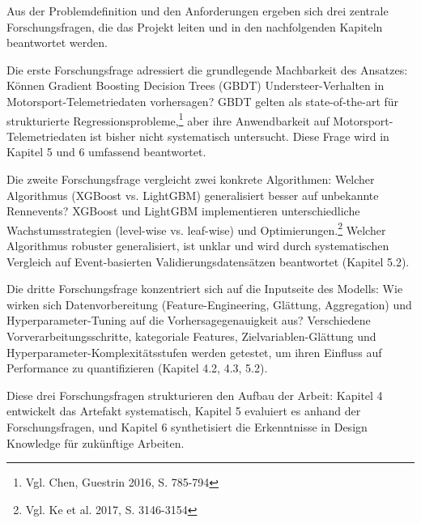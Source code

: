 Aus der Problemdefinition und den Anforderungen ergeben sich drei zentrale Forschungsfragen, die das Projekt leiten und in den nachfolgenden Kapiteln beantwortet werden.

Die erste Forschungsfrage adressiert die grundlegende Machbarkeit des Ansatzes: Können Gradient Boosting Decision Trees (GBDT) Understeer-Verhalten in Motorsport-Telemetriedaten vorhersagen? GBDT gelten als state-of-the-art für strukturierte Regressionsprobleme,\footnote{Vgl. Chen, Guestrin 2016, S. 785-794} aber ihre Anwendbarkeit auf Motorsport-Telemetriedaten ist bisher nicht systematisch untersucht. Diese Frage wird in Kapitel 5 und 6 umfassend beantwortet.

Die zweite Forschungsfrage vergleicht zwei konkrete Algorithmen: Welcher Algorithmus (XGBoost vs. LightGBM) generalisiert besser auf unbekannte Rennevents? XGBoost und LightGBM implementieren unterschiedliche Wachstumsstrategien (level-wise vs. leaf-wise) und Optimierungen.\footnote{Vgl. Ke et al. 2017, S. 3146-3154} Welcher Algorithmus robuster generalisiert, ist unklar und wird durch systematischen Vergleich auf Event-basierten Validierungsdatensätzen beantwortet (Kapitel 5.2).

Die dritte Forschungsfrage konzentriert sich auf die Inputseite des Modells: Wie wirken sich Datenvorbereitung (Feature-Engineering, Glättung, Aggregation) und Hyperparameter-Tuning auf die Vorhersagegenauigkeit aus? Verschiedene Vorverarbeitungsschritte, kategoriale Features, Zielvariablen-Glättung und Hyperparameter-Komplexitätsstufen werden getestet, um ihren Einfluss auf Performance zu quantifizieren (Kapitel 4.2, 4.3, 5.2).

Diese drei Forschungsfragen strukturieren den Aufbau der Arbeit: Kapitel 4 entwickelt das Artefakt systematisch, Kapitel 5 evaluiert es anhand der Forschungsfragen, und Kapitel 6 synthetisiert die Erkenntnisse in Design Knowledge für zukünftige Arbeiten.